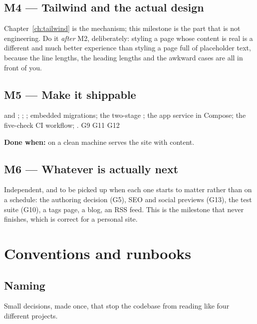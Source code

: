 \section{M4 --- Tailwind and the actual design}

Chapter~\ref{ch:tailwind} is the mechanism; this milestone is the part that is not engineering.
Do it \emph{after} M2, deliberately: styling a page whose content is real is a different and much
better experience than styling a page full of placeholder text, because the line lengths, the
heading lengths and the awkward cases are all in front of you.

\section{M5 --- Make it shippable}

 and ; ; ;
embedded migrations; the two-stage ; the app service in Compose; the five-check
CI workflow; . G9 G11 G12

\textbf{Done when:}  on a clean machine serves the site with content.

\section{M6 --- Whatever is actually next}

Independent, and to be picked up when each one starts to matter rather than on a schedule: the
authoring decision (G5), SEO and social previews (G13), the test suite (G10), a tags page, a blog,
an RSS feed. This is the milestone that never finishes, which is correct for a personal site.

\chapter{Conventions and runbooks}
\label{ch:conventions}

\section{Naming}

Small decisions, made once, that stop the codebase from reading like four different projects.

